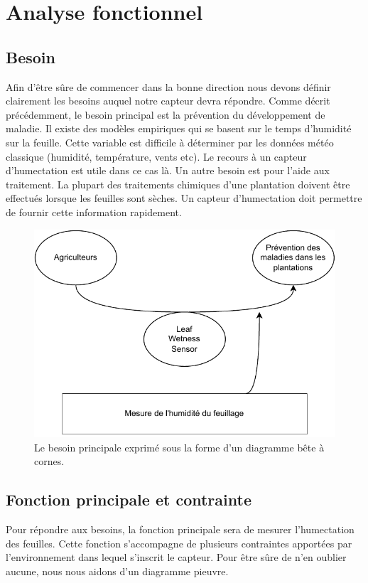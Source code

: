 \graphicspath{ {./figuresAnalysis} }
\section{Analyse fonctionnel}
\subsection{Besoin}
Afin d'être sûre de commencer dans la bonne direction nous devons définir clairement les besoins auquel notre capteur devra répondre. Comme décrit précédemment, le besoin principal est la prévention du développement de maladie. Il existe des modèles empiriques qui se basent sur le temps d'humidité sur la feuille. Cette variable est difficile à déterminer par les données météo classique (humidité, température, vents etc). Le recours à un capteur d'humectation est utile dans ce cas là.
Un autre besoin est pour l'aide aux traitement. La plupart des traitements chimiques d'une plantation doivent être effectués lorsque les feuilles sont sèches. Un capteur d'humectation doit permettre de fournir cette information rapidement.  

\begin{figure}[!ht]
 \centering
 \includegraphics{DiagrammeCorne.drawio.pdf}
 \caption{Le besoin principale exprimé sous la forme d'un diagramme bête à cornes.}
\end{figure}

\subsection{Fonction principale et contrainte }

Pour répondre aux besoins, la fonction principale sera de mesurer l'humectation des feuilles. Cette fonction s'accompagne de plusieurs contraintes apportées par l’environnement dans lequel s'inscrit le capteur. Pour être sûre de n'en oublier aucune, nous nous aidons d'un diagramme pieuvre. 


